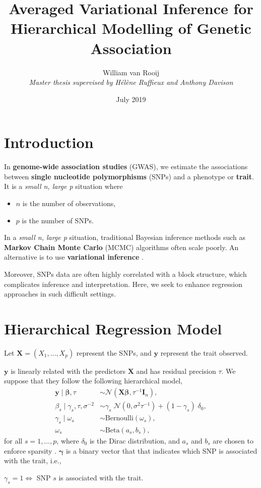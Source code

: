 \documentclass[portrait, a0, 30pt]{sciposter}
\author{William van Rooij\\ \textit{\normalsize Master thesis supervised by Hélène Ruffieux and Anthony Davison}}
\title{Averaged Variational Inference for Hierarchical Modelling of Genetic Association}
\date{July 2019}
\institute{École Polytechnique Fédérale de Lausanne, Lausanne, Switzerland}
\begin{document}
\maketitle
\begin{multicols*}{2}
\section{Introduction}
In \textbf{genome-wide association studies} (GWAS), we estimate the associations between \textbf{single nucleotide polymorphisms} (SNPs) and a phenotype or \textbf{trait}. It is a \textit{small n, large p} situation where
\begin{itemize}
\item $n$ is the number of observations,
\item $p$ is the number of SNPs.
\end{itemize}
In a \textit{small n, large p} situation, traditional Bayesian inference methods such as \textbf{Markov Chain Monte Carlo} (MCMC) algorithms often scale poorly. An alternative is to use \textbf{variational inference} \citep{varInf}.

Moreover, SNPs data are often highly correlated with a block structure, which complicates inference and interpretation. Here, we seek to enhance regression approaches in such difficult settings.



\section{Hierarchical Regression Model}
Let $\boldsymbol{X} = (X_1,\dots,X_p)$ represent the SNPs, and $\boldsymbol{y}$ represent the trait observed.

$\boldsymbol{y}$ is linearly related with the predictors $\boldsymbol{X}$ and has residual precision $\tau$. We suppose that they follow the following hierarchical model,
\begin{align*}
\boldsymbol{y} \mid \boldsymbol{\beta}, \tau &\sim\mathcal{N}\left(\boldsymbol{X\beta}, \tau^{-1}\boldsymbol{I}_n\right),\\
\beta_s \mid \gamma_s, \tau, \sigma^{-2} &\sim \gamma_s\;\mathcal{N} \left( 0, \sigma^2 \tau^{-1} \right) + (1-\gamma_s)\;\delta_0,\\
\gamma_s \mid \omega_s &\sim \mathrm{Bernoulli}\left(\omega_s\right),\\
\omega_s &\sim \mathrm{Beta}\left(a_s, b_s\right),
\end{align*}
for all $s = 1,\dots , p$, where $\delta_0$ is the Dirac distribution, and $a_s$ and $b_s$ are chosen to enforce sparsity \citep{eff_inf}. $\boldsymbol{\gamma}$ is a binary vector that that indicates which SNP is associated with the trait, i.e.,
\begin{center}
$\gamma_s = 1 \Longleftrightarrow$ SNP $ s $ is associated with the trait.
\end{center}

\end{multicols*}
\end{document}
